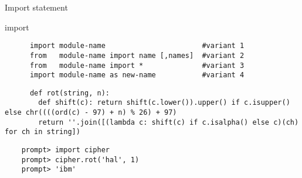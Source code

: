 \begin{frame}[fragile]{Import statement}
  \vspace{2pt}
  \begin{block}{import}
    \begin{verbatim}
      import module-name                       #variant 1
      from   module-name import name [,names]  #variant 2
      from   module-name import *              #variant 3
      import module-name as new-name           #variant 4
    \end{verbatim}
  \end{block}

  \begin{verbatim}
      def rot(string, n):
        def shift(c): return shift(c.lower()).upper() if c.isupper() else chr((((ord(c) - 97) + n) % 26) + 97)
        return ''.join([(lambda c: shift(c) if c.isalpha() else c)(ch) for ch in string])      
  \end{verbatim}
  
  \begin{verbatim}
    prompt> import cipher
    prompt> cipher.rot('hal', 1)
    prompt> 'ibm'
  \end{verbatim}
\end{frame}
